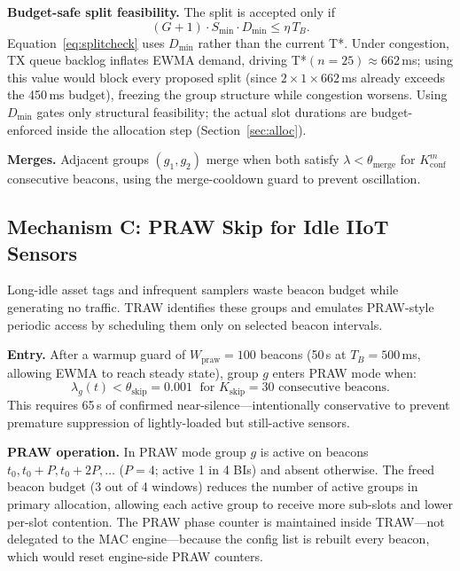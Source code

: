 \documentclass[journal]{IEEEtran}
\begin{document}
\textbf{Budget-safe split feasibility.}\label{sec:budget_fix}
The split is accepted only if
\begin{equation}
  (G+1)\cdot S_\mathrm{min}\cdot D_\mathrm{min} \leq \eta\,T_B.
  \label{eq:splitcheck}
\end{equation}
Equation~\eqref{eq:splitcheck} uses $D_\mathrm{min}$ rather than the
current T*.
Under congestion, TX queue backlog inflates EWMA demand, driving
T*$(n\!=\!25)\!\approx\!662$\,ms; using this value would block every
proposed split (since $2\!\times\!1\!\times\!662$\,ms already exceeds
the 450\,ms budget), freezing the group structure while congestion
worsens.
Using $D_\mathrm{min}$ gates only structural feasibility; the
actual slot durations are budget-enforced inside the allocation step
(Section~\ref{sec:alloc}).

\textbf{Merges.}
Adjacent groups $(g_1,g_2)$ merge when both satisfy
$\lambda\!<\!\theta_\mathrm{merge}$ for $K_\mathrm{conf}^m$ consecutive
beacons, using the merge-cooldown guard to prevent oscillation.

\subsection{Mechanism C: PRAW Skip for Idle IIoT Sensors}
\label{sec:praw}

Long-idle asset tags and infrequent samplers waste beacon budget while
generating no traffic.
TRAW identifies these groups and emulates PRAW-style periodic access by
scheduling them only on selected beacon intervals.

\textbf{Entry.}
After a warmup guard of $W_\mathrm{praw}\!=\!100$ beacons (50\,s at
$T_B\!=\!500$\,ms, allowing EWMA to reach steady state), group $g$
enters PRAW mode when:
\begin{equation}
  \lambda_g(t) < \theta_\mathrm{skip}\!=\!0.001 \;\text{ for }
  K_\mathrm{skip}\!=\!30 \text{ consecutive beacons.}
  \label{eq:prawenter}
\end{equation}
This requires 65\,s of confirmed near-silence---intentionally
conservative to prevent premature suppression of lightly-loaded
but still-active sensors.

\textbf{PRAW operation.}
In PRAW mode group $g$ is active on beacons $t_0, t_0+P, t_0+2P,\ldots$
($P\!=\!4$; active 1 in 4 BIs) and absent otherwise.
The freed beacon budget (3 out of 4 windows) reduces the number of
active groups in primary allocation, allowing each active group to
receive more sub-slots and lower per-slot contention.
The PRAW phase counter is maintained inside TRAW---not delegated to the
MAC engine---because the config list is rebuilt every beacon, which
would reset engine-side PRAW counters.
\end{document}
